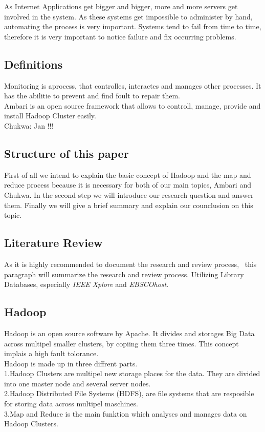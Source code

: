 As Internet Applications get bigger and bigger, more and more servers get involved in the system. As these systems get impossible to administer by hand, automating the process is very important. Systems tend to fail from time to time, therefore it is very important to notice failure and fix occurring problems.


\subsection{Definitions}
Monitoring is aprocess, that controlles, interactes and manages other processes. It has the abilitie to prevent and find foult to repair them.
\\
Ambari is an open source framework that allows to controll, manage, provide and install Hadoop Cluster easily. 
\\
Chukwa: Jan !!!

\subsection{Structure of this paper}
First of all we intend to explain the basic concept of Hadoop and  the map and reduce process because it is necessary for both of our main topics, Ambari and Chukwa. In the second step we will introduce our research question and answer them. Finally we will give a brief summary and explain our counclusion on this topic.

\subsection{Literature Review}
	As it is highly recommended to document the research and review process,~\cite{brocke09} this paragraph will summarize the research and review process.
	Utilizing Library Databases, especially \emph{IEEE Xplore} and \emph{EBSCOhost}.
	
\subsection{Hadoop}
Hadoop is an open source software by Apache. It divides and storages Big Data across multipel smaller clusters, by copiing them three times. This concept implais a high fault tolorance. 
 \\
 Hadoop is made up in three diffrent parts. 
  \\
  1.Hadoop Clusters are multipel new storage places for the data. They are divided into one master node and several server nodes.
  \\
  2.Hadoop Distributed File Systems (HDFS), are file systems that are resposible for storing data across multipel maschines.
  \\
  3.Map and Reduce is the main funktion which analyses and manages data on Hadoop Clusters.
